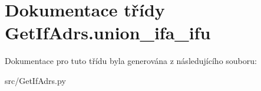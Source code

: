 \hypertarget{classGetIfAdrs_1_1union__ifa__ifu}{\section{Dokumentace třídy Get\-If\-Adrs.\-union\-\_\-ifa\-\_\-ifu}
\label{d6/d8e/classGetIfAdrs_1_1union__ifa__ifu}
}


Dokumentace pro tuto třídu byla generována z následujícího souboru\-:\begin{DoxyCompactItemize}
\item 
src/Get\-If\-Adrs.\-py\end{DoxyCompactItemize}
